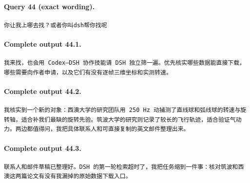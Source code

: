 \documentclass[UTF8,10pt]{ctexart}
\begin{document}
\paragraph{Query 44 (exact wording).}
\begin{Verbatim}[breaklines=true,breakanywhere=true,fontsize=\scriptsize,frame=single,framesep=2pt]
你让我上哪去找？或者你叫dsh帮你找呢
\end{Verbatim}

\paragraph{Complete output 44.1.}
\begin{Verbatim}[breaklines=true,breakanywhere=true,fontsize=\scriptsize,frame=single,framesep=2pt]
我来找，也会用 Codex–DSH 协作技能请 DSH 独立筛一遍。优先核实哪些数据能直接下载，哪些需要向作者申请，以及它们有没有逐帧三维坐标和实测转速。
\end{Verbatim}

\paragraph{Complete output 44.2.}
\begin{Verbatim}[breaklines=true,breakanywhere=true,fontsize=\scriptsize,frame=single,framesep=2pt]
我核实到一个新的对象：西澳大学的研究团队用 250 Hz 动捕测了直线球和弧线球的转速与旋转轴，适合补我们最缺的旋转先验。筑波大学的研究则记录了较长的飞行轨迹，适合验证气动力。两边都值得问，我把具体联系人和可直接复制的英文邮件整理出来。
\end{Verbatim}

\paragraph{Complete output 44.3.}
\begin{Verbatim}[breaklines=true,breakanywhere=true,fontsize=\scriptsize,frame=single,framesep=2pt]
联系人和邮件草稿已整理好。DSH 的第一轮检索超时了，我把任务缩到一件事：核对筑波和西澳这两篇论文有没有我漏掉的原始数据下载入口。
\end{Verbatim}
\end{document}
